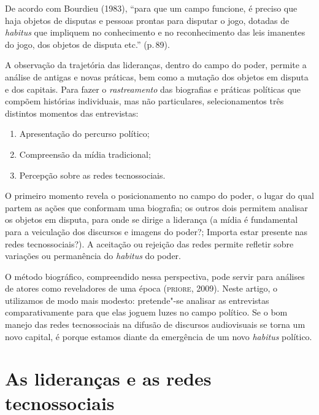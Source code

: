 De acordo com Bourdieu (1983), ``para que um campo funcione, é preciso
que haja objetos de disputas e pessoas prontas para disputar o jogo,
dotadas de \textit{habitus} que impliquem no conhecimento e no
reconhecimento das leis imanentes do jogo, dos objetos de disputa etc.''
(p.\,89).

A observação da trajetória das lideranças, dentro do campo do poder,
permite a análise de antigas e novas práticas, bem como a mutação dos
objetos em disputa e dos capitais. Para fazer o \textit{rastreamento} das
biografias e práticas políticas que compõem histórias individuais, mas
não particulares, selecionamentos três distintos momentos das
entrevistas: 

\begin{enumerate}
\item Apresentação do percurso político; 
\item Compreensão da mídia tradicional; 
\item Percepção sobre as redes tecnossociais.
\end{enumerate}

O primeiro momento revela o posicionamento no campo do poder, o lugar do qual
partem as ações que conformam uma biografia; os outros dois permitem
analisar os objetos em disputa, para onde se dirige a liderança (a mídia
é fundamental para a veiculação dos discursos e imagens do poder?;
Importa estar presente nas redes tecnossociais?). A aceitação ou
rejeição das redes permite refletir sobre variações ou permanência do
\textit{habitus} do poder.

O método biográfico, compreendido nessa perspectiva, pode servir para
análises de atores como reveladores de uma época (\textsc{priore}, 2009). Neste
artigo, o utilizamos de modo mais modesto: pretende"-se analisar as
entrevistas comparativamente para que elas joguem luzes no campo
político. Se o bom manejo das redes tecnossociais na difusão de
discursos audiovisuais se torna um novo capital, é porque estamos diante
da emergência de um novo \textit{habitus} político.

\section{As lideranças e as redes tecnossociais}

